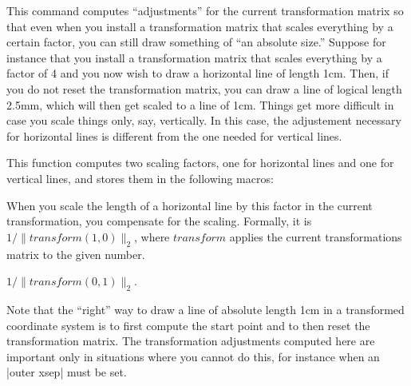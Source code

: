 \begin{command}{\pgftransformationadjustments}
  This command computes ``adjustments'' for the current transformation
  matrix so that even when you install a transformation matrix that
  scales everything by a certain factor, you can still draw
  something of ``an absolute size.'' Suppose for instance that you
  install a transformation matrix that scales everything by a factor
  of 4 and you now wish to draw a horizontal line of length 1cm. Then,
  if you do not reset the transformation matrix, you can draw a line
  of logical length 2.5mm, which will then get scaled to a line of
  1cm. Things get more difficult in case you scale things only, say,
  vertically. In this case, the adjustement necessary for horizontal
  lines is different from the one needed for vertical lines.
 
  This function computes two scaling factors, one for horizontal lines
  and one for vertical lines, and stores them in the following macros:
  \begin{command}{\pgfhorizontaltransformationadjustment}
    When you scale the length of a horizontal line by this factor in
    the current transformation, you compensate for the
    scaling. Formally, it is $1/\|\mathit{transform}(1,0)\|_2$, where
    $\mathit{transform}$ applies the current transformations matrix to
    the given number.
\begin{codeexample}[]
\end{codeexample}
\begin{codeexample}[]
\end{codeexample}
  \end{command}
  \begin{command}{\pgfverticaltransformationadjustment}
    $1/\|\mathit{transform}(0,1)\|_2$.
  \end{command}
 
  Note that the ``right'' way to draw a line of absolute length 1cm in
  a transformed coordinate system is to first compute the start point
  and to then reset the transformation matrix. The transformation
  adjustments computed here are important only in situations where you
  cannot do this, for instance when an |outer xsep| must be set.
\end{command}


